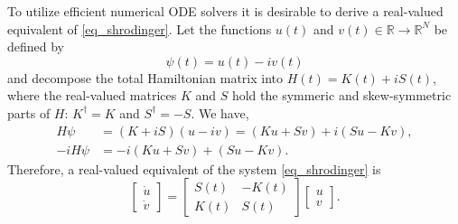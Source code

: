 \documentclass[11pt]{article}
\begin{document}
To utilize efficient numerical ODE solvers it is desirable to derive a real-valued equivalent of
\eqref{eq_shrodinger}. Let the functions $u(t)$ and $v(t) \in \mathbb{R} \to \mathbb{R}^N$ be
defined by
\[
\psi(t) = u(t) - iv(t)
\]
and decompose the total Hamiltonian matrix into $H(t) = K(t) + i S(t)$, where the real-valued
matrices $K$ and $S$ hold the symmeric and skew-symmetric parts of $H$: $K^\dag = K$ and $S^\dag =
-S$. We have,
\begin{align*}
H\psi &= (K+iS)(u - iv) = (Ku + Sv) + i(Su - Kv),\\
-iH\psi &= -i(Ku + Sv) + (Su - Kv).
\end{align*}
Therefore, a real-valued equivalent of the system \eqref{eq_shrodinger} is
\begin{equation}\label{eq_real-shrodinger}
  \begin{bmatrix} \dot{u}\\ \dot{v} \end{bmatrix} =
%
  \begin{bmatrix}
    S(t) & -K(t) \\ K(t) & S(t)
  \end{bmatrix}     
  \begin{bmatrix} u\\ v \end{bmatrix} .
\end{equation}
\end{document}
